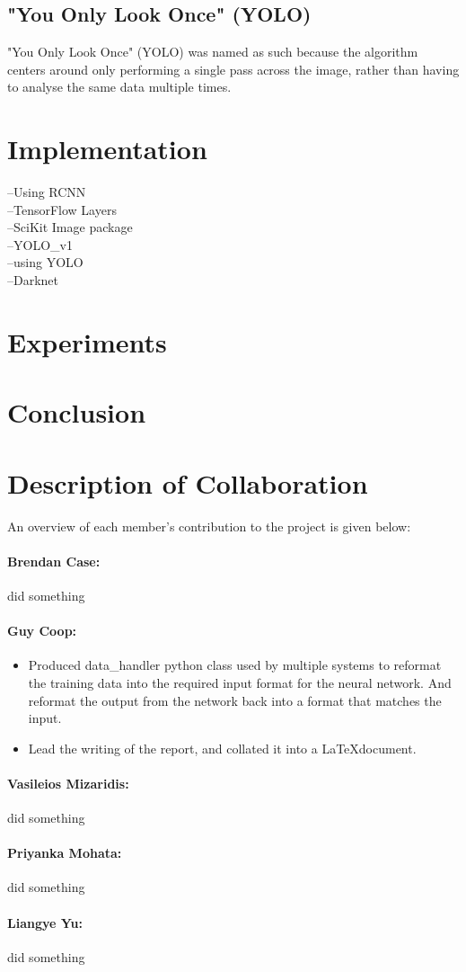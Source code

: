 \documentclass[10pt]{article}
\begin{document}
\subsection{"You Only Look Once" (YOLO)}
"You Only Look Once" (YOLO) was named as such because the algorithm centers around only performing a single pass across the image, rather than having to analyse the same data multiple times.
	

\section{Implementation}
--Using RCNN\\
--TensorFlow Layers \cite{tensorflow}\\
--SciKit Image package\cite{skimage}\\
--YOLO\_v1\cite{yolo_v1}\\
--using YOLO\cite{yolo_v2}\\
--Darknet\\

\section{Experiments}

\section{Conclusion}

\section{Description of Collaboration}
An overview of each member's contribution to the project is given below:
\paragraph{Brendan Case:}
did something

\paragraph{Guy Coop:}
\begin{itemize}
	\item Produced data\_handler python class used by multiple systems to reformat the training data into the required input format for the neural network. And reformat the output from the network back into a format that matches the input.
	\item Lead the writing of the report, and collated it into a \LaTeX document.
\end{itemize}

\paragraph{Vasileios Mizaridis:}
did something

\paragraph{Priyanka Mohata:}
did something

\paragraph{Liangye Yu:}
did something

\newpage


\end{document}
